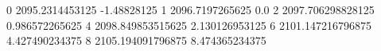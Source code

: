 0 2095.2314453125 -1.48828125
1 2096.7197265625 0.0
2 2097.706298828125 0.986572265625
4 2098.849853515625 2.130126953125
6 2101.147216796875 4.427490234375
8 2105.194091796875 8.474365234375
